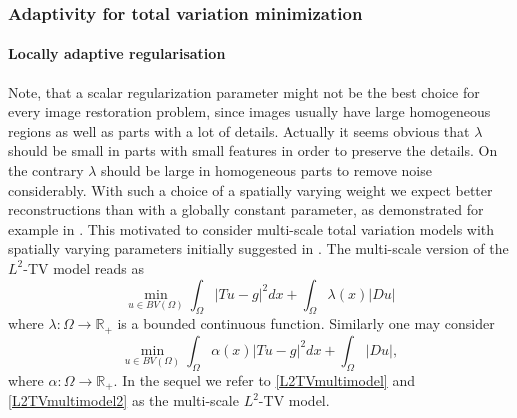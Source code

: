 \documentclass[enabledeprecatedfontcommands,cleardoublepage=empty,headsepline,twoside,11pt,DIV=15,BCOR=12mm,final]{scrartcl}
\newcommand{\R}{{\mathbb R}}
\begin{document}

\subsubsection{Adaptivity for total variation minimization}

\paragraph{Locally adaptive regularisation}

Note, that a scalar regularization parameter might not be the best choice for every image restoration problem, since images usually have large homogeneous regions as well as parts with a lot of details. Actually it seems obvious that $\lambda$ should be small in parts with small features in order to preserve the details. On the contrary $\lambda$ should be large in homogeneous parts to remove noise considerably. With such a choice of a spatially varying weight we expect better reconstructions than with a globally constant parameter, as demonstrated for example in \cite{DonHinRin,HinRin}. 
 This motivated to consider multi-scale total variation models with spatially varying parameters initially suggested in \cite{RudOsh}. The multi-scale version of the $L^2$-TV model reads as
\begin{equation}\label{L2TVmultimodel}
\min_{u\in BV(\Omega)}  \int_\Omega |Tu-g|^2 dx + \int_\Omega \lambda(x) |Du|
\end{equation}
where $\lambda: \Omega \to \R_+$ is a bounded continuous function. Similarly one may consider
\begin{equation}\label{L2TVmultimodel2}
\min_{u\in BV(\Omega)} \int_\Omega \alpha(x) |Tu-g|^2 dx +  \int_\Omega |Du|,
\end{equation}
where $\alpha:\Omega \to \R_+$. In the sequel we refer to \eqref{L2TVmultimodel} and \eqref{L2TVmultimodel2} as the multi-scale $L^2$-TV model.
\end{document}
